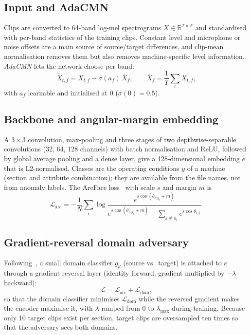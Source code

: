 \documentclass[conference]{IEEEtran}
\begin{document}
\subsection{Input and AdaCMN}
Clips are converted to 64-band log-mel spectrograms $X\in\mathbb{R}^{T\times F}$ and standardised with per-band statistics of the training clips. Constant level and microphone or noise offsets are a main source of source/target differences, and clip-mean normalisation removes them but also removes machine-specific level information. \emph{AdaCMN} lets the network choose per band:
\begin{equation}
\tilde X_{t,f}=X_{t,f}-\sigma(a_f)\,\bar X_f,\qquad \bar X_f=\frac1T\sum_{t}X_{t,f},
\end{equation}
with $a_f$ learnable and initialised at $0$ ($\sigma(0)=0.5$).

\subsection{Backbone and angular-margin embedding}
A $3\times3$ convolution, max-pooling and three stages of two depthwise-separable convolutions (32, 64, 128 channels) with batch normalisation and ReLU, followed by global average pooling and a dense layer, give a 128-dimensional embedding $e$ that is L2-normalised. Classes are the operating conditions $y$ of a machine (section and attribute combination); they are available from the file names, not from anomaly labels. The ArcFace loss~\cite{deng2019arcface} with scale $s$ and margin $m$ is
\begin{equation}
\mathcal{L}_{\mathrm{arc}}=-\frac1N\sum_i\log\frac{e^{s\cos(\theta_{i,y_i}+m)}}{e^{s\cos(\theta_{i,y_i}+m)}+\sum_{j\ne y_i}e^{s\cos\theta_{i,j}}} .
\end{equation}

\subsection{Gradient-reversal domain adversary}
Following~\cite{ganin2016dann}, a small domain classifier $g_d$ (source vs.\ target) is attached to $e$ through a gradient-reversal layer (identity forward, gradient multiplied by $-\lambda$ backward):
\begin{equation}
\mathcal{L}=\mathcal{L}_{\mathrm{arc}}+\mathcal{L}_{\mathrm{dom}},
\end{equation}
so that the domain classifier minimises $\mathcal{L}_{\mathrm{dom}}$ while the reversed gradient makes the encoder maximise it,
with $\lambda$ ramped from 0 to $\lambda_{\max}$ during training. Because only 10 target clips exist per section, target clips are oversampled ten times so that the adversary sees both domains.
\end{document}
